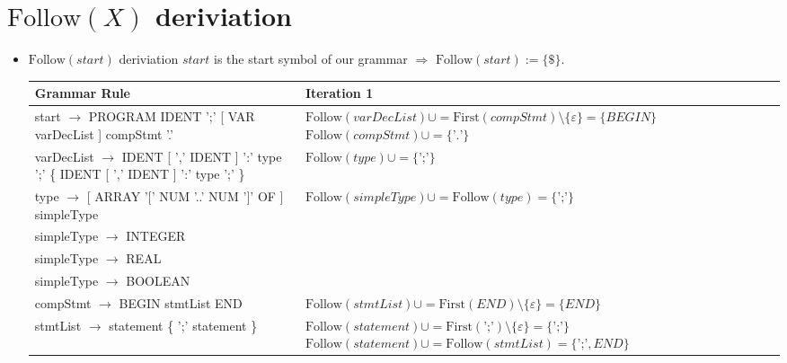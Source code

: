 \documentclass[8pt]{scrartcl}
\newcommand{\First}[1]{\mathrm{First}(#1)}
\newcommand{\Follow}[1]{\mathrm{Follow}(#1)}
\newcommand{\epsset}{\{\varepsilon\}}
\begin{document}
    \section{$\Follow{X}$ \textbf{deriviation}}
        \begin{itemize}
            \item $\Follow{start}$ deriviation\newline
                $start$ is the start symbol of our grammar $\Rightarrow$ $\Follow{start} := \{\$\}$.\newline
                \begin{tabular}{|l|l|}
                \hline
                \textbf{Grammar Rule} & \textbf{Iteration 1}\\
                \hline
                start $\rightarrow$ PROGRAM IDENT ';' [ VAR varDecList ] compStmt '.' & \makecell[l]{$\Follow{varDecList} \cup = \First{compStmt} \setminus \epsset = \{BEGIN\}$\\
                                                                                 $\Follow{compStmt} \cup = \{\text{'.'}\}$
                                                                                }\\
                \hline
                \makecell[l]{varDecList $\rightarrow$ IDENT [ ',' IDENT ]\\ ':' type ';' \{ IDENT [ ',' IDENT ] ':' type ';' \}} & $\Follow{type} \cup = \{\text{';'}\}$\\
                \hline
                type $\rightarrow$ [ ARRAY '$[$' NUM '..' NUM '$]$' OF ] simpleType & $\Follow{simpleType} \cup = \Follow{type} = \{\text{';'\}}$\\
                \hline
                simpleType $\rightarrow$ INTEGER &\\
                \hline
                simpleType $\rightarrow$ REAL &\\
                \hline
                simpleType $\rightarrow$ BOOLEAN &\\
                \hline
                compStmt $\rightarrow$ BEGIN stmtList END & $\Follow{stmtList} \cup = \First{END} \setminus \epsset = \{END\}$\\
                \hline
                stmtList $\rightarrow$ statement \{ ';' statement \} & \makecell[l]{$\Follow{statement} \cup = \First{\text{';'}}\setminus \epsset = \{\text{';'}\}$\\ $\Follow{statement} \cup = \Follow{stmtList} = \{\text{';'}, END\}$}\\

\end{tabular}
\end{itemize}
\end{document}
